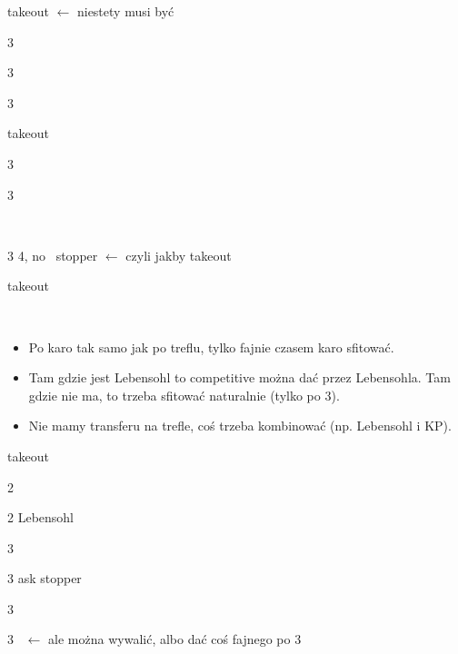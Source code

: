 \documentclass[12pt, a4paper]{article}
\begin{document}
\sequence{{1\clubs}{(3\clubs)}}
\begin{options}[1]
    \item[\dbl] takeout \gf $\leftarrow$ niestety musi być \gf
    \item[3\diams] \then\ \hearts\ \invp
    \item[3\hearts] \then\ \spades\ \invp
    \item[3\spades] \then\ \diams\ \gf
\end{options}

\sequence{{1\clubs}{(3\diams)}}
\begin{options}[1]
    \item[\dbl] takeout \gf
    \item[3\hearts] \then\ \spades\ \invp
    \item[3\spades] \then\ \hearts\ \gf
\end{options}

\sequence{{1\clubs}{(3\hearts)}}
\begin{options}[1]
    \item[\dbl] \spades\ \invp \imp
    \item[3\spades] 4\spades, no \hearts\ stopper \gf $\leftarrow$ czyli jakby takeout
\end{options}

\sequence{{1\clubs}{(3\spades)}}
\begin{options}[1]
    \item[\dbl] takeout \gf
\end{options}

\newpage
{\Huge{\diams}}\\
\begin{itemize}
    \item Po karo tak samo jak po treflu, tylko fajnie czasem karo
    sfitować. 
    \item Tam gdzie jest Lebensohl to \diams competitive można dać przez Lebensohla.
    Tam gdzie nie ma, to trzeba sfitować naturalnie (tylko po 3\clubs).
    \item Nie mamy transferu na trefle, coś trzeba kombinować (np. Lebensohl i KP).
\end{itemize}

\sequence{{1\diams}{(2\hearts)}}
\begin{options}[1]
    \item[\dbl] takeout
    \item[2\spades] \nat\ \nf
    \item[2\nt] Lebensohl
    \item[3\clubs] \then\ \diams\ \invp
    \item[3\diams] ask \hearts stopper \gf
    \item[3\hearts] \then\ \spades\ \invp
    \item[3\spades] \then\ \nt $\leftarrow$ ale można wywalić, albo dać coś fajnego po 3\nt
\end{options}
\end{document}
